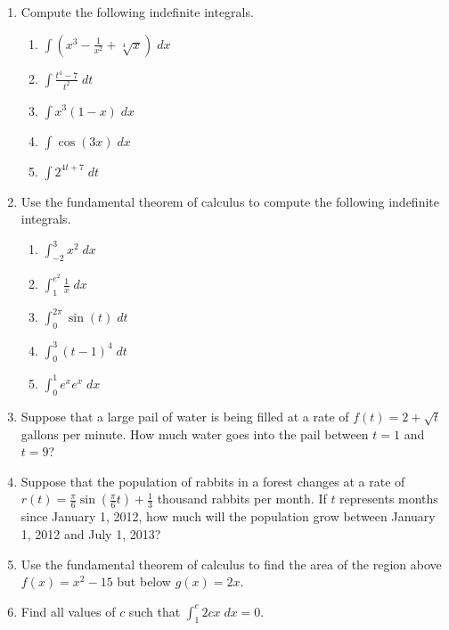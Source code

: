 \documentclass[11pt]{article}
\begin{document}
\drawtitle

\begin{enumerate}
  
\item Compute the following indefinite integrals.
  \begin{enumerate}
  \item $\displaystyle\int \left( x^3 - \frac{1}{x^2} +
      \sqrt[4]{x}\right)\;dx$
    \vfill
  \item $\displaystyle\int \frac{t^4-7}{t^2}\;dt$
    \vfill
  \item $\displaystyle\int x^3\left( 1 - x\right)\;dx$
    \vfill

    \newpage

  \item $\displaystyle\int \cos(3x)\;dx$
    \vfill

  \item $\displaystyle\int 2^{4t+7}\;dt$
    \vfill
  \end{enumerate}
  
  \newpage

\item Use the fundamental theorem of calculus to compute the following
  indefinite integrals.
  \begin{enumerate}
  \item $\displaystyle\int_{-2}^3 x^2\;dx$
    \vfill
  \item $\displaystyle\int_1^{e^2} \frac{1}{x}\;dx$
    \vfill
  \item $\displaystyle\int_0^{2\pi} \sin(t)\;dt$
    \vfill

    \newpage
    
  \item $\displaystyle\int_0^3 (t-1)^4\;dt$
    \vfill

  \item $\displaystyle\int_0^1 e^xe^x\;dx$
    \vfill
  \end{enumerate}
  
  \newpage
  
\item Suppose that a large pail of water is being filled at a rate of
  $f(t) = 2+\sqrt{t}$ gallons per minute.  How much water goes into
  the pail between $t = 1$ and $t = 9$?
  
  \vfill

\item Suppose that the population of rabbits in a forest changes at a
  rate of $r(t) = \frac{\pi}{6}\sin\left(\frac{\pi}{6}t\right) +
  \frac{1}{3}$ thousand rabbits per month.  If $t$ represents months
  since January 1, 2012, how much will the population grow between
  January 1, 2012 and July 1, 2013?

  \vfill

  \newpage
  
\item Use the fundamental theorem of calculus to find the area of the
  region above $f(x) = x^2 - 15$ but below $g(x) = 2x$.
  
  \vfill

\item Find all values of $c$ such that $\displaystyle\int_{1}^c 2cx\; dx = 0$.

  \vfill

\end{enumerate}
\end{document}
